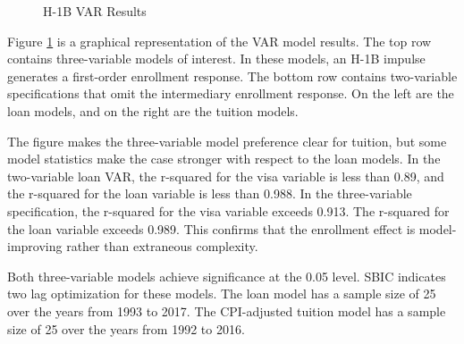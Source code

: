 \documentclass[review]{elsarticle}
\begin{document}
\begin{figure}[h!]
    \centering
    \caption{H-1B VAR Results}
    \label{fig:var_results}
\end{figure}

Figure \ref{fig:var_results} is a graphical representation of the VAR model results.
The top row contains three-variable models of interest.
In these models, an H-1B impulse generates a first-order enrollment response.
The bottom row contains two-variable specifications that omit the intermediary enrollment response.
On the left are the loan models, and on the right are the tuition models.

The figure makes the three-variable model preference clear for tuition,
but some model statistics make the case stronger with respect to the loan models.
In the two-variable loan VAR, the r-squared for the visa variable is less than 0.89,
and the r-squared for the loan variable is less than 0.988.
In the three-variable specification, the r-squared for the visa variable exceeds 0.913.
The r-squared for the loan variable exceeds 0.989.
This confirms that the enrollment effect is model-improving rather than extraneous complexity.

Both three-variable models achieve significance at the 0.05 level.
SBIC indicates two lag optimization for these models.
The loan model has a sample size of 25 over the years from 1993 to 2017.
The CPI-adjusted tuition model has a sample size of 25 over the years from 1992 to 2016.
\end{document}
